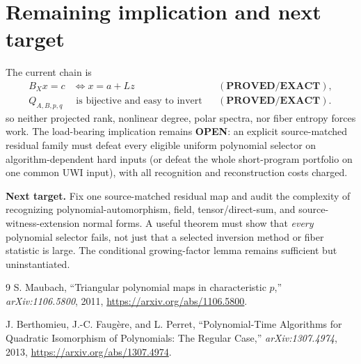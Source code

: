\documentclass[11pt]{article}
\newcommand{\EXACT}{\textbf{PROVED/EXACT}}
\newcommand{\OPEN}{\textbf{OPEN}}
\begin{document}
\section{Remaining implication and next target}
The current chain is
\[
\begin{aligned}
B_Xx=c&\Longleftrightarrow x=a+Lz &&(\EXACT),\\
Q_{A,B,p,q}&\text{ is bijective and easy to invert} &&(\EXACT).
\end{aligned}
\]
so neither projected rank, nonlinear degree, polar spectra, nor fiber entropy
forces work.  The load-bearing implication remains \OPEN{}:
an explicit source-matched residual family must defeat every eligible uniform
polynomial selector on algorithm-dependent hard inputs (or defeat the whole
short-program portfolio on one common UWI input), with all recognition and
reconstruction costs charged.

\textbf{Next target.}  Fix one source-matched residual map and audit the
complexity of recognizing polynomial-automorphism, field, tensor/direct-sum,
and source-witness-extension normal forms.  A useful theorem must show that
\emph{every} polynomial selector fails, not just that a selected inversion
method or fiber statistic is large.  The conditional growing-factor lemma
remains sufficient but uninstantiated.

\begin{thebibliography}{9}
S. Maubach, ``Triangular polynomial maps in characteristic $p$,''
\emph{arXiv:1106.5800}, 2011,
\url{https://arxiv.org/abs/1106.5800}.

J. Berthomieu, J.-C. Faug\`ere, and L. Perret,
``Polynomial-Time Algorithms for Quadratic Isomorphism of Polynomials: The
Regular Case,'' \emph{arXiv:1307.4974}, 2013,
\url{https://arxiv.org/abs/1307.4974}.
\end{thebibliography}
\end{document}
